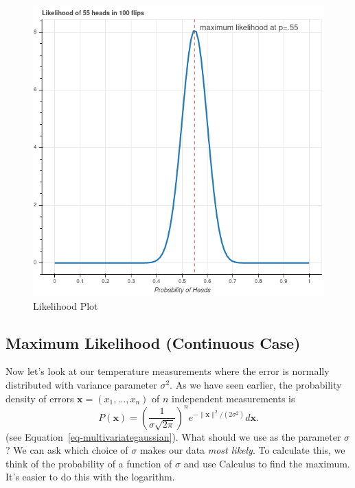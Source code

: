 \documentclass[
  11pt,
  letterpaper,
]{scrbook}
\theoremstyle{plain}
\theoremstyle{plain}
\theoremstyle{remark}
\begin{document}
\begin{figure}

{\centering \includegraphics{chapters/img/beta.png}

}

\caption{\label{fig-beta}Likelihood Plot}

\end{figure}

\hypertarget{maximum-likelihood-continuous-case}{%
\subsection{Maximum Likelihood (Continuous
Case)}\label{maximum-likelihood-continuous-case}}

Now let's look at our temperature measurements where the error is
normally distributed with variance parameter \(\sigma^2\). As we have
seen earlier, the probability density of errors
\(\mathbf{x}=(x_1,\ldots,x_n)\) of \(n\) independent measurements is \[
P(\mathbf{x}) = \left(\frac{1}{\sigma\sqrt{2\pi}}\right)^{n}e^{-\|\mathbf{x}\|^2/(2\sigma^2)}d\mathbf{x}.
\] (see Equation~\ref{eq-multivariategaussian}). What should we use as
the parameter \(\sigma\)? We can ask which choice of \(\sigma\) makes
our data \emph{most likely}. To calculate this, we think of the
probability of a function of \(\sigma\) and use Calculus to find the
maximum. It's easier to do this with the logarithm.
\end{document}

